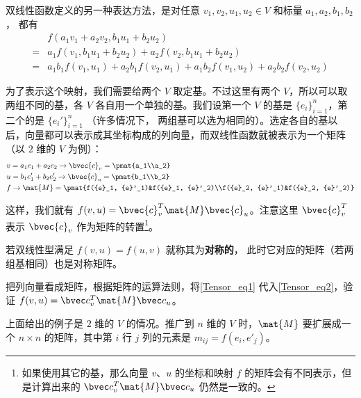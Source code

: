 双线性函数定义的另一种表达方法，是对任意 $v_1, v_2, u_1, u_2\in V$ 和标量 $a_1,a_2,b_1,b_2$， 都有
\begin{equation}\label{Tensor_eq2}
\begin{aligned}
 &f(a_1{v}_1+a_2{v}_2, b_1{u}_1+b_2{u}_2)\\
={}&a_1f({v}_1, b_1{u}_1+b_2{u}_2)+a_2f({v}_2, b_1{u}_1+b_2{u}_2)\\
={}&a_1b_1f({v}_1, {u}_1)+a_2b_1f({v}_2, {u}_1)+a_1b_2f({v}_1, {u}_2)+a_2b_2f({v}_2, {u}_2)
\end{aligned}
\end{equation}

为了表示这个映射，我们需要给两个 $V$ 取定基。不过这里有两个 $V$，所以可以取两组不同的基，各 $V$ 各自用一个单独的基。我们设第一个 $V$ 的基是 $\{{e}_i\}^n_{i=1}$，第二个的是 $\{{e}_i'\}^n_{i=1}$ （许多情况下， 两组基可以选为相同的）。选定各自的基以后，向量都可以表示成其坐标构成的列向量，而双线性函数就被表示为一个矩阵（以 $2$ 维的 $V$ 为例）：
\begin{equation}\label{Tensor_eq1}
\begin{aligned}
&{v}=a_1{e}_1+a_2{e}_2\rightarrow   \bvec{c}_v =\pmat{a_1\\a_2}\\
&{u}=b_1{e}'_1+b_2{e}'_2\rightarrow  \bvec{c}_u =\pmat{b_1\\b_2}\\
&f\rightarrow \mat{M}=\pmat{f({e}_1, {e}'_1)&f({e}_1, {e}'_2)\\f({e}_2, {e}'_1)&f({e}_2, {e}'_2)}\\
\end{aligned}
\end{equation}

这样，我们就有 $f({v}, {u})=  \bvec{c}_v^T \mat{M} \bvec{c}_u$。注意这里 $\bvec{c}_v^T$ 表示 $ \bvec{c}_v$ 作为矩阵的转置\footnote{如果使用其它的基，那么向量 ${v}$、${u}$ 的坐标和映射 $f$ 的矩阵会有不同表示，但是计算出来的 $ \bvec c_v^T\mat{M}  \bvec c_u$ 仍然是一致的。}。

若双线性型满足 $f(v, u) = f(u, v)$ 就称其为\textbf{对称的}， 此时它对应的矩阵（若两组基相同）也是对称矩阵。

\begin{exercise}{}\label{Tensor_exe1}
把列向量看成矩阵，根据矩阵的运算法则，将\autoref{Tensor_eq1} 代入\autoref{Tensor_eq2}，验证 $f({v}, {u})=  \bvec c_v^T\mat{M}  \bvec c_u$。
\end{exercise}

上面给出的例子是 $2$ 维的 $V$ 的情况。推广到 $n$ 维的 $V$ 时，$\mat{M}$ 要扩展成一个 $n\times n$ 的矩阵，其中第 $i$ 行 $j$ 列的元素是 $m_{ij}=f({e}_i, {e}'_j)$。

